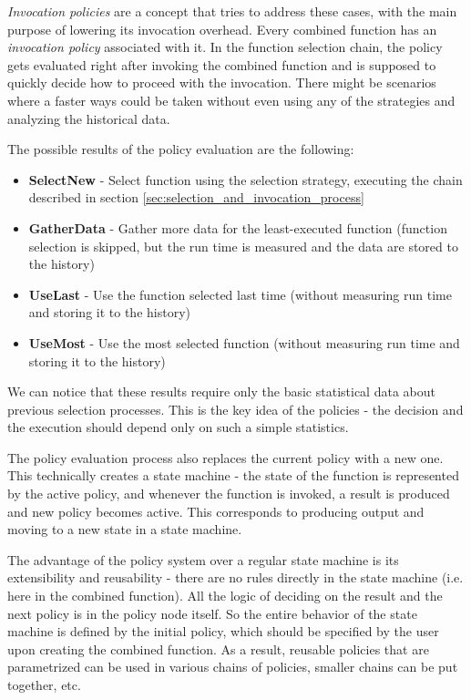 \textit{Invocation policies} are a concept that tries to address these cases, with the main purpose of lowering its invocation overhead. Every combined function has an \textit{invocation policy} associated with it. In the function selection chain, the policy gets evaluated right after invoking the combined function and is supposed to quickly decide how to proceed with the invocation. There might be scenarios where a faster ways could be taken without even using any of the strategies and analyzing the historical data.

The possible results of the policy evaluation are the following:

\begin{itemize}
	\item \textbf{SelectNew} - Select function using the selection strategy, executing the chain described in section \ref{sec:selection_and_invocation_process}
	\item \textbf{GatherData} - Gather more data for the least-executed function (function selection is skipped, but the run time is measured and the data are stored to the history)
	\item \textbf{UseLast} - Use the function selected last time (without measuring run time and storing it to the history)
	\item \textbf{UseMost} - Use the most selected function (without measuring run time and storing it to the history)
\end{itemize}

We can notice that these results require only the basic statistical data about previous selection processes. This is the key idea of the policies - the decision and the execution should depend only on such a simple statistics.

The policy evaluation process also replaces the current policy with a new one. This technically creates a state machine - the state of the function is represented by the active policy, and whenever the function is invoked, a result is produced and new policy becomes active. This corresponds to producing output and moving to a new state in a state machine.

The advantage of the policy system over a regular state machine is its extensibility and reusability - there are no rules directly in the state machine (i.e. here in the combined function). All the logic of deciding on the result and the next policy is in the policy node itself. So the entire behavior of the state machine is defined by the initial policy, which should be specified by the user upon creating the combined function. As a result, reusable policies that are parametrized can be used in various chains of policies, smaller chains can be put together, etc.

